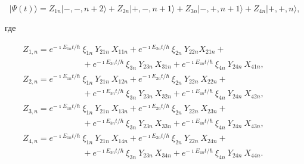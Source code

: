 \begin{equation}

|\Psi(t)\rangle = Z_{1n} |-,-,n+2\rangle + Z_{2n} |+,-,n+1\rangle  + Z_{3n} |-,+,n+1\rangle  + Z_{4n} |+,+,n\rangle, \label{bash:(8)}

\end{equation}

где

\begin{gather}

Z_{1,n} = e^{- \imath E_{1n} t/\hbar}\> \xi_{1n} \> Y_{21n} \> X_{11n} + e^{- \imath E_{2n} t/\hbar}\>  \xi_{2n}\> Y_{22n} X_{21n}+\hspace{3cm}

\\

\hspace{3cm} + e^{- \imath E_{3n} t/\hbar}\> \xi_{3n}\> Y_{23n}\> X_{31n} + e^{- \imath E_{4n} t/\hbar} \>\xi_{4n}\> Y_{24n}\> X_{41n},

\\

Z_{2,n} = e^{- \imath E_{1n} t/\hbar}\> \xi_{1n}\> Y_{21n}\> X_{12n} + e^{- \imath E_{2n} t/\hbar} \>\xi_{2n} \> Y_{22n}\> X_{22n}  + \hspace{3cm}

\\

\hspace{3cm}+ e^{- \imath E_{3n} t/\hbar}\> \xi_{3n}\> Y_{23n}\> X_{32n} + e^{- \imath E_{4n} t/\hbar}\>  \xi_{4n} \> Y_{24n}\>  X_{42n},

\\

Z_{3,n} = e^{- \imath E_{1n} t/\hbar}\> \xi_{1n}\> Y_{21n}\> X_{13n} + e^{- \imath E_{2n} t/\hbar} \>\xi_{2n} \> Y_{22n}\> X_{23n}+ \hspace{3cm}

\\

\hspace{3cm} + e^{- \imath E_{3n} t/\hbar} \> \xi_{3n}\> Y_{23n}\> X_{33n} + e^{- \imath E_{4n} t/\hbar}\> \xi_{4n} \> Y_{24n}\> X_{43n},

\\

Z_{4,n} = e^{-\imath E_{1n} t/\hbar}\> \xi_{1n}\> Y_{21n}\> X_{14n} + e^{- \imath E_{2n} t/\hbar}\> \xi_{2n}\> Y_{22n}\> X_{24n}+ \hspace{3cm}

\\

\hspace{3cm}+ e^{- \imath E_{3n} t/\hbar}\> \xi_{3n}\> Y_{23n}\> X_{34n} + e^{- \imath E_{4n} t /\hbar}\> \xi_{4n}\> Y_{24n}\> X_{44n}.

\end{gather}

